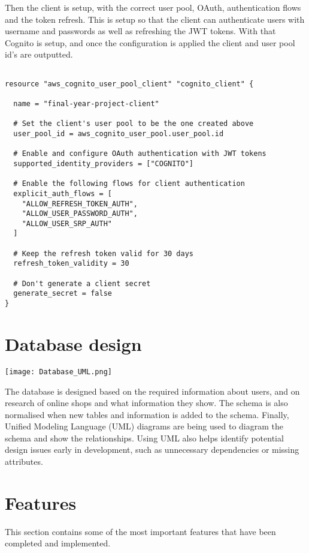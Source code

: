 \documentclass[]{project_report}
\begin{document}
Then the client is setup, with the correct user pool, OAuth, authentication flows and the token refresh. This is setup so that the client can authenticate users with username and passwords as well as refreshing the JWT tokens. With that Cognito is setup, and once the configuration is applied the client and user pool id's are outputted.  
\begin{verbatim}

resource "aws_cognito_user_pool_client" "cognito_client" {

  name = "final-year-project-client"

  # Set the client's user pool to be the one created above
  user_pool_id = aws_cognito_user_pool.user_pool.id

  # Enable and configure OAuth authentication with JWT tokens
  supported_identity_providers = ["COGNITO"]

  # Enable the following flows for client authentication
  explicit_auth_flows = [
    "ALLOW_REFRESH_TOKEN_AUTH",
    "ALLOW_USER_PASSWORD_AUTH",
    "ALLOW_USER_SRP_AUTH"
  ]

  # Keep the refresh token valid for 30 days
  refresh_token_validity = 30

  # Don't generate a client secret
  generate_secret = false
}

\end{verbatim}

\section{Database design}

\texttt{[image: Database\_UML.png]}

The database is designed based on the required information about users, and on research of online shops and what information they show. The schema is also normalised when new tables and information is added to the schema. Finally, Unified Modeling Language (UML) diagrams are being used to diagram the schema and show the relationships. Using UML also helps identify potential design issues early in development, such as unnecessary dependencies or missing attributes.

\section{Features}

This section contains some of the most important features that have been completed and implemented. 
\end{document}
